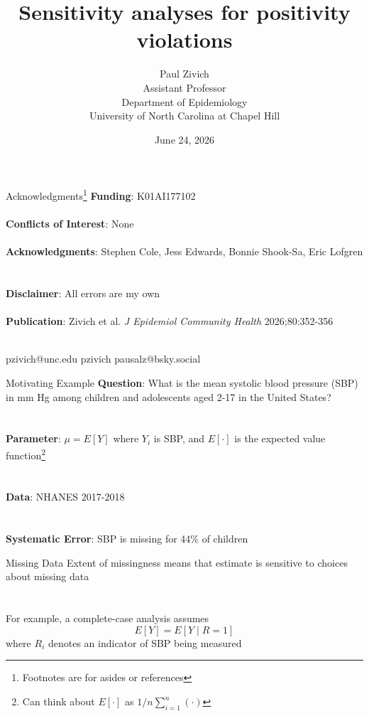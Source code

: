 \documentclass[aspectratio=169]{beamer}
\title[Positivity Violations]{Sensitivity analyses for positivity violations}
\author[PN Zivich]{Paul Zivich \\ Assistant Professor \\ Department of Epidemiology \\ University of North Carolina at Chapel Hill}
\date{June 24, 2026}
\begin{document}
	
\begin{frame}[plain]
	\maketitle
\end{frame}

\begin{frame}{Acknowledgments\footnote[frame]{Footnotes are for asides or references}}
	\textbf{Funding}: K01AI177102
	~\\~\\
	\textbf{Conflicts of Interest}: None
	~\\~\\
	\textbf{Acknowledgments}: Stephen Cole, Jess Edwards, Bonnie Shook-Sa, Eric Lofgren
	~\\~\\
	\textbf{Disclaimer}: All errors are my own
	~\\~\\
	\textbf{Publication}: Zivich et al. \textit{J Epidemiol Community Health} 2026;80:352-356
	~\\~\\
	\begin{center}
		\small
		\faEnvelope \quad pzivich@unc.edu \qquad \quad 
		\faGithub \quad pzivich \qquad \quad
		\faHashtag \quad pausalz@bsky.social
	\end{center}	
\end{frame}

\begin{frame}{Motivating Example}
	\textbf{Question}: What is the mean systolic blood pressure (SBP) in mm Hg among children and adolescents aged 2-17 in the United States?
	\\~\\~\\
	\textbf{Parameter}: $\mu = E[Y]$ where $Y_i$ is SBP, and $E[\cdot]$ is the expected value function\footnote[frame]{Can think about $E[\cdot]$ as $1/n \sum_{i=1}^{n} (\cdot)$}
	~\\~\\~\\
	\textbf{Data}: NHANES 2017-2018
	~\\~\\~\\
	\textbf{Systematic Error}: SBP is missing for 44\% of children	
\end{frame}

\begin{frame}{Missing Data}
	Extent of missingness means that estimate is sensitive to choices about missing data
	~\\~\\~\\
	For example, a complete-case analysis assumes
	$$ E[Y] = E[Y \mid R=1] $$
	where $R_i$ denotes an indicator of SBP being measured
\end{frame}
\end{document}
